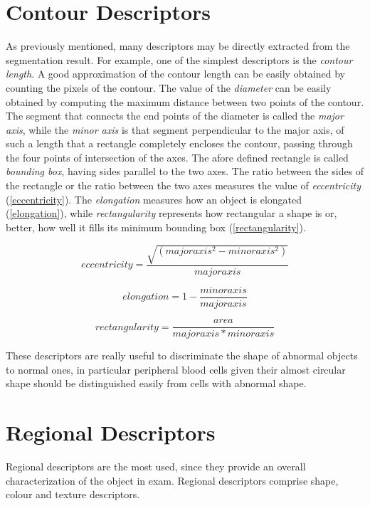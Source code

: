 \documentclass[final,a4paper,12pt,english]{UnicaPhdThesis3}
\begin{document}
	\section{Contour Descriptors} %
	As previously mentioned, many descriptors may be directly extracted from the segmentation result. For example, one of the simplest descriptors is the \textit{contour length}. A good approximation of the contour length can be easily obtained by counting the pixels of the contour. The value of the \textit{diameter} can be easily obtained by computing the maximum distance between two points of the contour. The segment that connects the end points of the diameter is called the \textit{major axis}, while the \textit{minor axis} is that segment perpendicular to the major axis, of such a length that a rectangle completely encloses the contour, passing through the four points of intersection of the axes. The afore defined rectangle is called \textit{bounding box}, having sides parallel to the two axes. The ratio between the sides of the rectangle or the ratio between the two axes measures the value of \textit{eccentricity} (\ref{eccentricity}). The \textit{elongation} measures how an object is elongated (\ref{elongation}), while \textit{rectangularity} represents how rectangular a shape is or, better, how well it fills its minimum bounding box (\ref{rectangularity}).
	
	\begin{equation}\label{eccentricity}
	eccentricity=\frac{\sqrt{(major axis^2 - minor axis^2) }}{major axis}
	\end{equation}
	
	\begin{equation}\label{elongation}
	elongation=1 - \frac{minor axis}{major axis}
	\end{equation}
	
	\begin{equation}\label{rectangularity}
	rectangularity=\frac{area}{major axis*minor axis}
	\end{equation}
	
	These descriptors are really useful to discriminate the shape of abnormal objects to normal ones, in particular peripheral blood cells given their almost circular shape should be distinguished easily from cells with abnormal shape. 
	
	\section{Regional Descriptors} %
	Regional descriptors are the most used, since they provide an overall characterization of the object in exam. Regional descriptors comprise shape, colour and texture descriptors.
	
\end{document}
